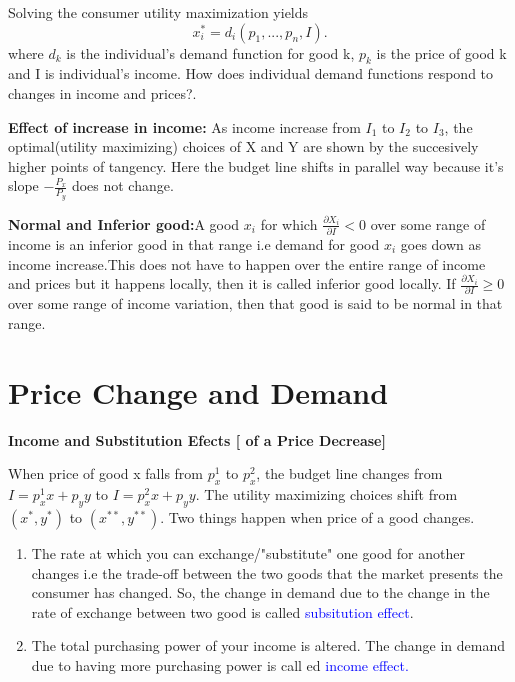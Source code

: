 \documentclass{tufte-handout}
\begin{document}
Solving the consumer utility maximization yields
\[
x_i^* = d_i(p_1,...,p_n, I)
.\] 
where $d_k$ is the individual's demand function for good k,  $p_k$ is the price of good k and I is individual's income.
How does individual demand functions respond to changes in income and prices?.





\clearpage

\textbf{Effect of increase in income:} As income increase from $I_1$ to $I_2$ to $I_3$, the optimal(utility maximizing) choices of X and Y are shown by the succesively higher points of tangency. Here the budget line shifts in parallel way because it's slope $-\frac{P_x}{P_y}$ does not change.

\textbf{Normal and Inferior good:}A good $x_i$ for which  $\frac{\partial X_i}{\partial I} < 0$ over some range of income is an inferior good in that range i.e demand for good $x_i$ goes down as income increase.This does not have to happen over the entire range of income and prices but it happens locally, then it is called inferior good locally. If $\frac{\partial X_i}{\partial I} \ge 0$ over some range of income variation, then that good is said to be  normal in that range.


\vspace{2cm}

\section{\textbf{Price Change and Demand}}

\textbf{\centering  Income and Substitution Efects [ of a Price Decrease] }\\
\vspace{0.5cm}

When price of good x falls from $p^1_x$ to $p^2_x$, the budget line changes from  $ I = p_x^1x + p_yy$ to  $ I = p_x^2x + p_yy$. The utility maximizing choices shift from  $(x^*,y^*)$ to $(x^{**},y^{**})$. Two things happen when price of a good changes.

\begin{enumerate}
		\item The rate at which you can exchange/"substitute"  one good for another changes i.e the trade-off between the two goods that the market presents the consumer has changed. So, the change in demand due to the change in the rate of exchange between two good is called \textcolor{blue}{subsitution effect}.

		\item The total purchasing power of your income is altered. The change in demand due to having more purchasing power is call
ed \textcolor{blue}{ income effect.}

\end{enumerate}
\end{document}
